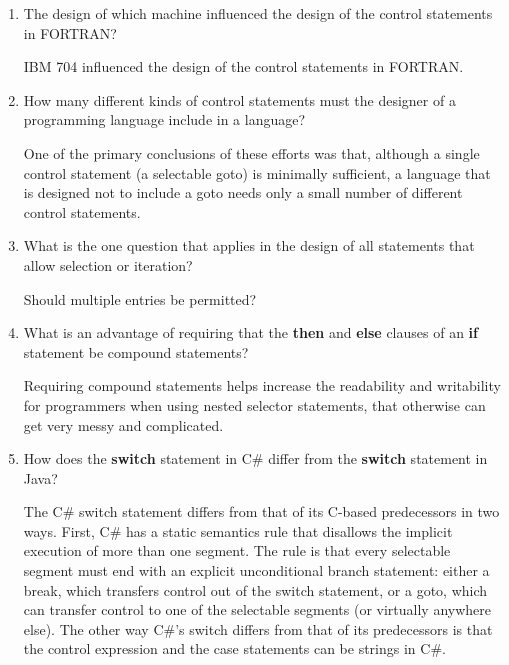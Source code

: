 \begin{enumerate}
  \item The design of which machine influenced the design
    of the control statements in FORTRAN?
    
    \begin{answer}
    
    IBM 704 influenced the design of the control statements in FORTRAN.
    
    \end{answer}

  \item How many different kinds of control statements
    must the designer of a programming language include
    in a language?
    
    \begin{answer}
    
     One of the primary conclusions of these efforts was that, although a single control statement (a selectable goto) is minimally sufficient, a language that is designed not to include a goto needs only a small number of different control statements.
     
    \end{answer}

  \item What is the one question that applies in the
    design of all statements that allow selection or
    iteration?
    
    \begin{answer}
     Should multiple entries be permitted?
    \end{answer}

  \item What is an advantage of requiring that
    the \textbf{then} and \textbf{else} clauses of
    an \textbf{if} statement be compound statements?
    
    \begin{answer}
    
    Requiring compound statements helps increase the readability and writability for programmers when using nested selector statements, that otherwise can get very messy and complicated.
    
    \end{answer}

  \item How does the \textbf{switch} statement in C\#
    differ from the \textbf{switch} statement in Java?
    
    \begin{answer}
    The C\# switch statement differs from that of its C-based predecessors
	in two ways. First, C\# has a static semantics rule that disallows the 			implicit execution of more than one segment. The rule is that every 			selectable segment must end with an explicit unconditional branch statement: 	 either a break, which transfers control out of the switch statement, or a 		goto, which can transfer control to one of the selectable segments (or 			virtually anywhere else). The other way C\#’s switch differs from that of 		its predecessors is that the control expression and the case statements can 	be strings in C\#.


\end{answer}
\end{enumerate}
